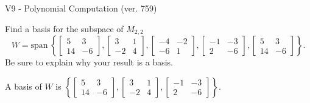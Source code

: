 \begin{exercise}
  \begin{exerciseTitle}V9 - Polynomial Computation (ver. 759)\end{exerciseTitle}
  \begin{exerciseStatement}
    Find a basis for the subspace of \(M_{2,2}\) 
\[W=\mathrm{span}\ \left\{\left[\begin{array}{cc}
5 & 3 \\
14 & -6
\end{array}\right] , \left[\begin{array}{cc}
3 & 1 \\
-2 & 4
\end{array}\right] , \left[\begin{array}{cc}
-4 & -2 \\
-6 & 1
\end{array}\right] , \left[\begin{array}{cc}
-1 & -3 \\
2 & -6
\end{array}\right] , \left[\begin{array}{cc}
5 & 3 \\
14 & -6
\end{array}\right]\right\}.\]
 Be sure to explain why your result is a basis.


  \end{exerciseStatement}
  \begin{exerciseAnswer}
   A basis of \(W\) is  \(\left\{\left[\begin{array}{cc}
5 & 3 \\
14 & -6
\end{array}\right] , \left[\begin{array}{cc}
3 & 1 \\
-2 & 4
\end{array}\right] , \left[\begin{array}{cc}
-1 & -3 \\
2 & -6
\end{array}\right]\right\}\).
  


  \end{exerciseAnswer}
\end{exercise}